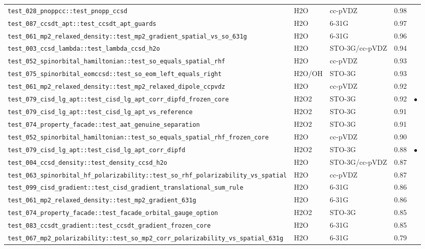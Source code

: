 \documentclass[10pt]{article}
\begin{document}
\begin{longtable}{l l l r c}
\texttt{test\_028\_pnoppcc::test\_pnopp\_ccsd} & H2O & cc-pVDZ & 0.98 &  \\
\texttt{test\_087\_ccsdt\_apt::test\_ccsdt\_apt\_guards} & H2O & 6-31G & 0.97 &  \\
\texttt{test\_061\_mp2\_relaxed\_density::test\_mp2\_gradient\_spatial\_vs\_so\_631g} & H2O & 6-31G & 0.96 &  \\
\texttt{test\_003\_ccsd\_lambda::test\_lambda\_ccsd\_h2o} & H2O & STO-3G/cc-pVDZ & 0.94 &  \\
\texttt{test\_052\_spinorbital\_hamiltonian::test\_so\_equals\_spatial\_rhf} & H2O & cc-pVDZ & 0.93 &  \\
\texttt{test\_075\_spinorbital\_eomccsd::test\_so\_eom\_left\_equals\_right} & H2O/OH & STO-3G & 0.93 &  \\
\texttt{test\_061\_mp2\_relaxed\_density::test\_mp2\_relaxed\_dipole\_ccpvdz} & H2O & cc-pVDZ & 0.92 &  \\
\texttt{test\_079\_cisd\_lg\_apt::test\_cisd\_lg\_apt\_corr\_dipfd\_frozen\_core} & H2O2 & STO-3G & 0.92 & $\bullet$ \\
\texttt{test\_079\_cisd\_lg\_apt::test\_cisd\_lg\_apt\_vs\_reference} & H2O2 & STO-3G & 0.91 &  \\
\texttt{test\_074\_property\_facade::test\_aat\_genuine\_separation} & H2O2 & STO-3G & 0.91 &  \\
\texttt{test\_052\_spinorbital\_hamiltonian::test\_so\_equals\_spatial\_rhf\_frozen\_core} & H2O & cc-pVDZ & 0.90 &  \\
\texttt{test\_079\_cisd\_lg\_apt::test\_cisd\_lg\_apt\_corr\_dipfd} & H2O2 & STO-3G & 0.88 & $\bullet$ \\
\texttt{test\_004\_ccsd\_density::test\_density\_ccsd\_h2o} & H2O & STO-3G/cc-pVDZ & 0.87 &  \\
\texttt{test\_063\_spinorbital\_hf\_polarizability::test\_so\_rhf\_polarizability\_vs\_spatial} & H2O & cc-pVDZ & 0.87 &  \\
\texttt{test\_099\_cisd\_gradient::test\_cisd\_gradient\_translational\_sum\_rule} & H2O & 6-31G & 0.86 &  \\
\texttt{test\_061\_mp2\_relaxed\_density::test\_mp2\_gradient\_631g} & H2O & 6-31G & 0.86 &  \\
\texttt{test\_074\_property\_facade::test\_facade\_orbital\_gauge\_option} & H2O2 & STO-3G & 0.85 &  \\
\texttt{test\_083\_ccsdt\_gradient::test\_ccsdt\_gradient\_frozen\_core} & H2O & 6-31G & 0.85 &  \\
\texttt{test\_067\_mp2\_polarizability::test\_so\_mp2\_corr\_polarizability\_vs\_spatial\_631g} & H2O & 6-31G & 0.79 &  \\

\end{longtable}
\end{document}
